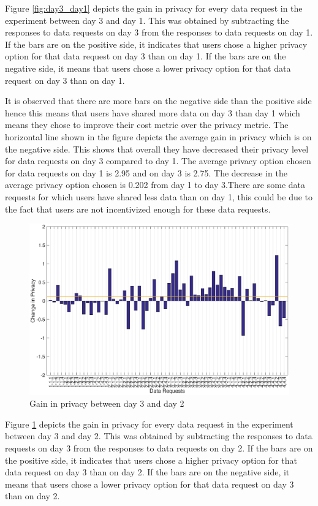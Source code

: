 Figure \ref{fig:day3_day1} depicts the gain in privacy for every data request in the experiment between day 3 and day 1. This was obtained by subtracting the responses to data requests on day 3 from the responses to data requests on day 1. If the bars are on the positive side, it indicates that users chose a higher privacy option for that data request on day 3 than on day 1. If the bars are on the negative side, it means that users chose a lower privacy option for that data request on day 3 than on day 1.

It is observed that there are more bars on the negative side than the positive side hence this means that users have shared more data on day 3 than day 1 which means they chose to improve their cost metric over the privacy metric. The horizontal line shown in the figure depicts the average gain in privacy which is on the negative side. This shows that overall they have decreased their privacy level for data requests on day 3 compared to day 1. The average privacy option chosen for data requests on day 1 is 2.95 and on day 3 is 2.75. The decrease in the average privacy option chosen is  0.202 from day 1 to day 3.There are some data requests for which users have shared less data than on day 1, this could be due to the fact that users are not incentivized enough for these data requests.

\begin{figure}[ht!]
\centering
\includegraphics[width=\textwidth]{./images/day3_day2}
\caption{Gain in privacy between day 3 and day 2}
\label{fig:day3_day2}
\end{figure}

Figure \ref{fig:day3_day2} depicts the gain in privacy for every data request in the experiment between day 3 and day 2. This was obtained by subtracting the responses to data requests on day 3 from the responses to data requests on day 2. If the bars are on the positive side, it indicates that users chose a higher privacy option for that data request on day 3 than on day 2. If the bars are on the negative side, it means that users chose a lower privacy option for that data request on day 3 than on day 2.

